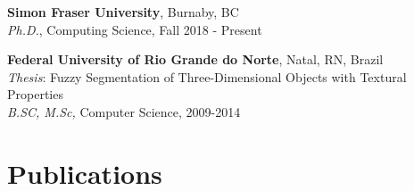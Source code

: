 \documentclass[letterpaper]{article}
\renewenvironment{itemize}{
  \begin{list}{}{
      \setlength{\leftmargin}{1.5em}
    }
  }{
  \end{list}
}
\begin{document}
\begin{itemize}
 
 \item \textbf{Simon Fraser University}, Burnaby, BC \\
 \textit{Ph.D.}, Computing Science, Fall 2018 - Present
 
 \item \textbf{Federal University of Rio Grande do Norte}, Natal, RN, Brazil \\
 \textit{Thesis}: Fuzzy Segmentation of Three-Dimensional Objects with Textural Properties \\
 \textit{B.SC, M.Sc,} Computer Science, 2009-2014
 
  


  
\end{itemize}

\section*{Publications}
\end{document}
